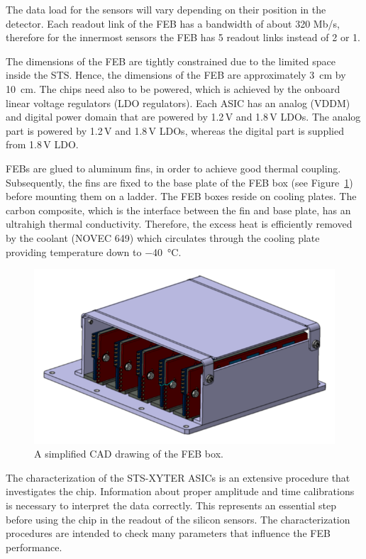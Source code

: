 The data load for the sensors will vary depending on their position in the detector. Each readout link of the \gls{FEB} has a bandwidth of about 320 Mb/s, therefore for the innermost sensors the \gls{FEB} has 5 readout links instead of 2 or 1. 

The dimensions of the \gls{FEB} are tightly constrained due to the limited space inside the \gls{STS}. Hence, the dimensions of the \gls{FEB} are approximately \SI{3}{\centi\metre} by \SI{10}{\centi\metre}. The chips need also to be powered, which is achieved by the onboard linear voltage regulators (\gls{LDO} regulators). Each \gls{ASIC} has an analog (VDDM) and digital power domain that are powered by 1.2\,V and 1.8\,V \glspl{LDO}. The analog part is powered by 1.2\,V and 1.8\,V \glspl{LDO}, whereas the digital part is supplied from 1.8\,V \gls{LDO}.

\glspl{FEB} are glued to aluminum fins, in order to achieve good thermal coupling. Subsequently, the fins are fixed to the base plate of the \gls{FEB} box (see Figure~\ref{feb_box}) before mounting them on a ladder. The \gls{FEB} boxes reside on cooling plates. The carbon composite, which is the interface between the fin and base plate, has an ultrahigh thermal conductivity. Therefore, the excess heat is efficiently removed by the coolant (NOVEC 649) which circulates through the cooling plate providing temperature down to \SI{-40}{\celsius}. 

\begin{figure}[!h]
\centering
\includegraphics[width=0.55\columnwidth]{Chapter2/images/feb_box_1.png}
\caption{A simplified CAD drawing of the \gls{FEB} box.}
\label{feb_box}
\end{figure}


The characterization of the STS-XYTER ASICs is an extensive procedure that investigates the chip. Information about proper amplitude and time calibrations is necessary to interpret the data correctly. This represents an essential step before using the chip in the readout of the silicon sensors. The characterization procedures are intended to
check many parameters that influence the \gls{FEB} performance. 


